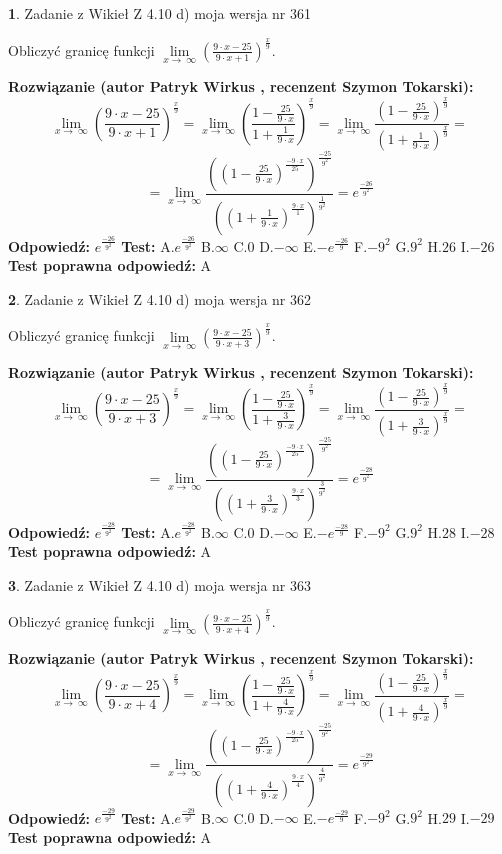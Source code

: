 \documentclass[12pt, a4paper]{article}
\theoremstyle{definition} %
\newtheorem{zad}{}
\newcommand{\zadStart}[1]{\begin{zad}#1\newline}
\newcommand{\zadStop}{\end{zad}}
\newcommand{\rozwStart}[2]{\noindent \textbf{Rozwiązanie (autor #1 , recenzent #2): }\newline}
\newcommand{\rozwStop}{\newline}
\newcommand{\odpStart}{\noindent \textbf{Odpowiedź:}\newline}
\newcommand{\odpStop}{\newline}
\newcommand{\testStart}{\noindent \textbf{Test:}\newline}
\newcommand{\testStop}{\newline}
\newcommand{\kluczStart}{\noindent \textbf{Test poprawna odpowiedź:}\newline}
\newcommand{\kluczStop}{\newline}
\begin{document}
\zadStart{Zadanie z Wikieł Z 4.10 d) moja wersja nr 361}


Obliczyć granicę funkcji  $\lim\limits_{x\to\ \infty}(\frac{9\cdot x-25}{9\cdot x+1})^{\frac{x}{9}}$.
\zadStop
\rozwStart{Patryk Wirkus}{Szymon Tokarski}
$$\lim\limits_{x\to\ \infty}(\frac{9\cdot x-25}{9\cdot x+1})^{\frac{x}{9}} = \lim\limits_{x\to\ \infty}(\frac{1-\frac{25}{9\cdot x}}{1+\frac{1}{9\cdot x}})^{\frac{x}{9}}=\lim\limits_{x\to\ \infty}\frac{(1-\frac{25}{9\cdot x})^{\frac{x}{9}}}{(1+\frac{1}{9\cdot x})^{\frac{x}{9}}}=$$
$$=\lim\limits_{x\to\ \infty}\frac{((1-\frac{25}{9\cdot x})^{\frac{-9\cdot x}{25}})^{\frac{-25}{9^{2}}}}{((1+\frac{1}{9\cdot x})^{\frac{9\cdot x}{1}})^{\frac{1}{9^{2}}}}=e^{\frac{-26}{9^{2}}}$$
\rozwStop
\odpStart
$e^{\frac{-26}{9^{2}}}$
\odpStop
\testStart
A.$e^{\frac{-26}{9^{2}}}$ B.$\infty$ C.$0$ D.$-\infty$ E.$-e^{\frac{-26}{9}}$
F.$-9^{2}$ G.$9^{2}$
H.$26$
I.$-26$
\testStop
\kluczStart
A
\kluczStop



\zadStart{Zadanie z Wikieł Z 4.10 d) moja wersja nr 362}


Obliczyć granicę funkcji  $\lim\limits_{x\to\ \infty}(\frac{9\cdot x-25}{9\cdot x+3})^{\frac{x}{9}}$.
\zadStop
\rozwStart{Patryk Wirkus}{Szymon Tokarski}
$$\lim\limits_{x\to\ \infty}(\frac{9\cdot x-25}{9\cdot x+3})^{\frac{x}{9}} = \lim\limits_{x\to\ \infty}(\frac{1-\frac{25}{9\cdot x}}{1+\frac{3}{9\cdot x}})^{\frac{x}{9}}=\lim\limits_{x\to\ \infty}\frac{(1-\frac{25}{9\cdot x})^{\frac{x}{9}}}{(1+\frac{3}{9\cdot x})^{\frac{x}{9}}}=$$
$$=\lim\limits_{x\to\ \infty}\frac{((1-\frac{25}{9\cdot x})^{\frac{-9\cdot x}{25}})^{\frac{-25}{9^{2}}}}{((1+\frac{3}{9\cdot x})^{\frac{9\cdot x}{3}})^{\frac{3}{9^{2}}}}=e^{\frac{-28}{9^{2}}}$$
\rozwStop
\odpStart
$e^{\frac{-28}{9^{2}}}$
\odpStop
\testStart
A.$e^{\frac{-28}{9^{2}}}$ B.$\infty$ C.$0$ D.$-\infty$ E.$-e^{\frac{-28}{9}}$
F.$-9^{2}$ G.$9^{2}$
H.$28$
I.$-28$
\testStop
\kluczStart
A
\kluczStop



\zadStart{Zadanie z Wikieł Z 4.10 d) moja wersja nr 363}


Obliczyć granicę funkcji  $\lim\limits_{x\to\ \infty}(\frac{9\cdot x-25}{9\cdot x+4})^{\frac{x}{9}}$.
\zadStop
\rozwStart{Patryk Wirkus}{Szymon Tokarski}
$$\lim\limits_{x\to\ \infty}(\frac{9\cdot x-25}{9\cdot x+4})^{\frac{x}{9}} = \lim\limits_{x\to\ \infty}(\frac{1-\frac{25}{9\cdot x}}{1+\frac{4}{9\cdot x}})^{\frac{x}{9}}=\lim\limits_{x\to\ \infty}\frac{(1-\frac{25}{9\cdot x})^{\frac{x}{9}}}{(1+\frac{4}{9\cdot x})^{\frac{x}{9}}}=$$
$$=\lim\limits_{x\to\ \infty}\frac{((1-\frac{25}{9\cdot x})^{\frac{-9\cdot x}{25}})^{\frac{-25}{9^{2}}}}{((1+\frac{4}{9\cdot x})^{\frac{9\cdot x}{4}})^{\frac{4}{9^{2}}}}=e^{\frac{-29}{9^{2}}}$$
\rozwStop
\odpStart
$e^{\frac{-29}{9^{2}}}$
\odpStop
\testStart
A.$e^{\frac{-29}{9^{2}}}$ B.$\infty$ C.$0$ D.$-\infty$ E.$-e^{\frac{-29}{9}}$
F.$-9^{2}$ G.$9^{2}$
H.$29$
I.$-29$
\testStop
\kluczStart
A
\kluczStop
\end{document}
